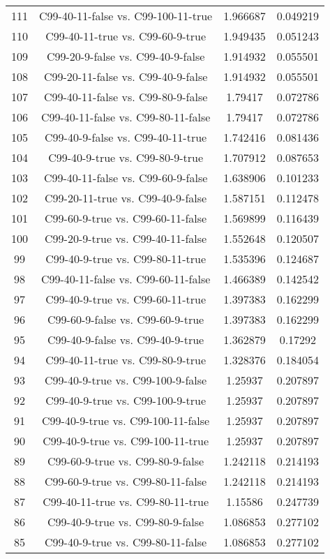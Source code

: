 \documentclass[a4paper,10pt]{article}
\begin{document}
\begin{landscape}
\begin{table}[!htp]
\begin{tabular}{cccc}
111&C99-40-11-false vs. C99-100-11-true&1.966687&0.049219\\
110&C99-40-11-true vs. C99-60-9-true&1.949435&0.051243\\
109&C99-20-9-false vs. C99-40-9-false&1.914932&0.055501\\
108&C99-20-11-false vs. C99-40-9-false&1.914932&0.055501\\
107&C99-40-11-false vs. C99-80-9-false&1.79417&0.072786\\
106&C99-40-11-false vs. C99-80-11-false&1.79417&0.072786\\
105&C99-40-9-false vs. C99-40-11-true&1.742416&0.081436\\
104&C99-40-9-true vs. C99-80-9-true&1.707912&0.087653\\
103&C99-40-11-false vs. C99-60-9-false&1.638906&0.101233\\
102&C99-20-11-true vs. C99-40-9-false&1.587151&0.112478\\
101&C99-60-9-true vs. C99-60-11-false&1.569899&0.116439\\
100&C99-20-9-true vs. C99-40-11-false&1.552648&0.120507\\
99&C99-40-9-true vs. C99-80-11-true&1.535396&0.124687\\
98&C99-40-11-false vs. C99-60-11-false&1.466389&0.142542\\
97&C99-40-9-true vs. C99-60-11-true&1.397383&0.162299\\
96&C99-60-9-false vs. C99-60-9-true&1.397383&0.162299\\
95&C99-40-9-false vs. C99-40-9-true&1.362879&0.17292\\
94&C99-40-11-true vs. C99-80-9-true&1.328376&0.184054\\
93&C99-40-9-true vs. C99-100-9-false&1.25937&0.207897\\
92&C99-40-9-true vs. C99-100-9-true&1.25937&0.207897\\
91&C99-40-9-true vs. C99-100-11-false&1.25937&0.207897\\
90&C99-40-9-true vs. C99-100-11-true&1.25937&0.207897\\
89&C99-60-9-true vs. C99-80-9-false&1.242118&0.214193\\
88&C99-60-9-true vs. C99-80-11-false&1.242118&0.214193\\
87&C99-40-11-true vs. C99-80-11-true&1.15586&0.247739\\
86&C99-40-9-true vs. C99-80-9-false&1.086853&0.277102\\
85&C99-40-9-true vs. C99-80-11-false&1.086853&0.277102\\

\end{tabular}
\end{table}
\end{landscape}
\end{document}
